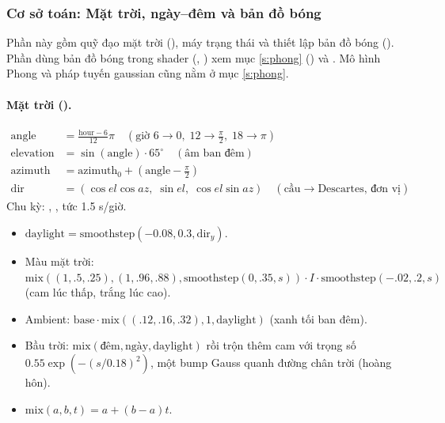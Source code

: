 \subsubsection{Cơ sở toán: Mặt trời, ngày--đêm và bản đồ bóng}\label{s:sun}
Phần này gồm quỹ đạo mặt trời (), máy trạng thái  và thiết lập bản đồ bóng (). Phần dùng bản đồ bóng trong shader (, ) xem mục \ref{s:phong} () và . Mô hình Phong và pháp tuyến gaussian cũng nằm ở mục \ref{s:phong}.

\paragraph{Mặt trời ().}
\begin{align*}
\mathrm{angle}&=\tfrac{\mathrm{hour}-6}{12}\pi\quad(\text{giờ }6\to0,\;12\to\tfrac\pi2,\;18\to\pi)\\
\mathrm{elevation}&=\sin(\mathrm{angle})\cdot65^\circ\quad(\text{âm ban đêm})\\
\mathrm{azimuth}&=\mathrm{azimuth}_0+(\mathrm{angle}-\tfrac\pi2)\\
\mathrm{dir}&=(\cos el\cos az,\;\sin el,\;\cos el\sin az)\quad(\text{cầu}\to\text{Descartes, đơn vị})
\end{align*}
Chu kỳ: , , tức 1.5 s/giờ.
\begin{itemize}
\item $\mathrm{daylight}=\mathrm{smoothstep}(-0.08,0.3,\mathrm{dir}_y)$.
\item Màu mặt trời: $\mathrm{mix}((1,.5,.25),(1,.96,.88),\mathrm{smoothstep}(0,.35,s))\cdot I\cdot\mathrm{smoothstep}(-.02,.2,s)$ (cam lúc thấp, trắng lúc cao).
\item Ambient: $\mathrm{base}\cdot\mathrm{mix}((.12,.16,.32),1,\mathrm{daylight})$ (xanh tối ban đêm).
\item Bầu trời: $\mathrm{mix}(\text{đêm},\text{ngày},\mathrm{daylight})$ rồi trộn thêm cam với trọng số $0.55\exp(-(s/0.18)^2)$, một bump Gauss quanh đường chân trời (hoàng hôn).
\item $\mathrm{mix}(a,b,t)=a+(b-a)t$.
\end{itemize}

